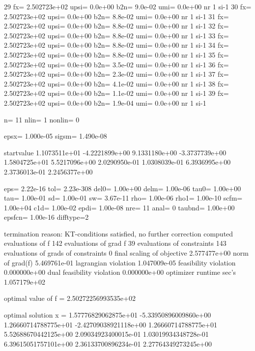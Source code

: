 \documentclass[article]{jss}
\begin{document}
\begin{Schunk}
\begin{Soutput}
   29 fx=   2.502723e+02 upsi=  0.0e+00 b2n=  9.0e-02 umi=  0.0e+00 nr   1 si-1
   30 fx=   2.502723e+02 upsi=  0.0e+00 b2n=  8.8e-02 umi=  0.0e+00 nr   1 si-1
   31 fx=   2.502723e+02 upsi=  0.0e+00 b2n=  8.8e-02 umi=  0.0e+00 nr   1 si-1
   32 fx=   2.502723e+02 upsi=  0.0e+00 b2n=  8.8e-02 umi=  0.0e+00 nr   1 si-1
   33 fx=   2.502723e+02 upsi=  0.0e+00 b2n=  8.8e-02 umi=  0.0e+00 nr   1 si-1
   34 fx=   2.502723e+02 upsi=  0.0e+00 b2n=  8.8e-02 umi=  0.0e+00 nr   1 si-1
   35 fx=   2.502723e+02 upsi=  0.0e+00 b2n=  3.5e-02 umi=  0.0e+00 nr   1 si-1
   36 fx=   2.502723e+02 upsi=  0.0e+00 b2n=  2.3e-02 umi=  0.0e+00 nr   1 si-1
   37 fx=   2.502723e+02 upsi=  0.0e+00 b2n=  4.1e-02 umi=  0.0e+00 nr   1 si-1
   38 fx=   2.502723e+02 upsi=  0.0e+00 b2n=  1.1e-02 umi=  0.0e+00 nr   1 si-1
   39 fx=   2.502723e+02 upsi=  0.0e+00 b2n=  1.9e-04 umi=  0.0e+00 nr   1 si-1


     n=        11    nlin=         1    nonlin=         0

  epsx= 1.000e-05 sigsm= 1.490e-08

startvalue
  1.1073511e+01  -4.2221899e+00   9.1331180e+00  -3.3737739e+00   1.5804725e+01 
  5.5217096e+00   2.0290950e-01   1.0308039e-01   6.3936995e+00   2.3736013e-01 
  2.2456377e+00 

  eps=  2.22e-16  tol= 2.23e-308 del0=  1.00e+00 delm=  1.00e-06 tau0=  1.00e+00
  tau=  1.00e-01   sd=  1.00e-01   sw=  3.67e-11  rho=  1.00e-06 rho1=  1.00e-10
 scfm=  1.00e+04  c1d=  1.00e-02 epdi=  1.00e-08
  nre=        11 anal=         0
taubnd=  1.00e+00 epsfcn=  1.00e-16 difftype=2

 termination reason:
 KT-conditions satisfied, no further correction computed
 evaluations of f                          142
 evaluations of grad f                      39
 evaluations of constraints                143
 evaluations of grads of constraints         0
 final scaling of objective           2.577477e+00
 norm of grad(f)                      5.469761e-01
 lagrangian violation                 1.047009e-05
 feasibility violation                0.000000e+00
 dual feasibility violation           0.000000e+00
 optimizer runtime sec's              1.057179e+02


 optimal value of f =   2.50272256993535e+02

 optimal solution  x =
  1.57776829062875e+01 -5.33950896009860e+00  1.26660714788775e+01
 -2.42709038921118e+00  1.26660714788775e+01  5.52688670442125e+00
  2.09034923400015e-01  1.03019934348728e-01  6.39615051757101e+00
  2.36133700896234e-01  2.27764349273245e+00


\end{Soutput}
\end{Schunk}
\end{document}

